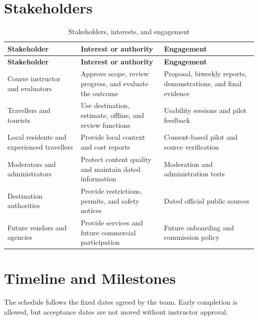 \documentclass[11pt,a4paper]{article}
\newcommand{\hd}[1]{\textbf{#1}}
\begin{document}
\clearpage
\section{Stakeholders}
{\small
\begin{longtable}{L{40mm}L{54mm}L{52mm}}
\caption{Stakeholders, interests, and engagement}\label{tab:stakeholders}\\
\toprule
\hd{Stakeholder} & \hd{Interest or authority} & \hd{Engagement} \\
\midrule
\endfirsthead
\toprule
\hd{Stakeholder} & \hd{Interest or authority} & \hd{Engagement} \\
\midrule
\endhead
\bottomrule
\endlastfoot
Course instructor and evaluators & Approve scope, review progress, and evaluate the outcome & Proposal, biweekly reports, demonstrations, and final evidence \\
Travellers and tourists & Use destination, estimate, offline, and review functions & Usability sessions and pilot feedback \\
Local residents and experienced travellers & Provide local context and cost reports & Consent-based pilot and source verification \\
Moderators and administrators & Protect content quality and maintain dated information & Moderation and administration tests \\
Destination authorities & Provide restrictions, permits, and safety notices & Dated official public sources \\
Future vendors and agencies & Provide services and future commercial participation & Future onboarding and commission policy \\
\end{longtable}
}

\section{Timeline and Milestones}
The schedule follows the fixed dates agreed by the team. Early completion is allowed, but acceptance dates are not moved without instructor approval.
\end{document}
